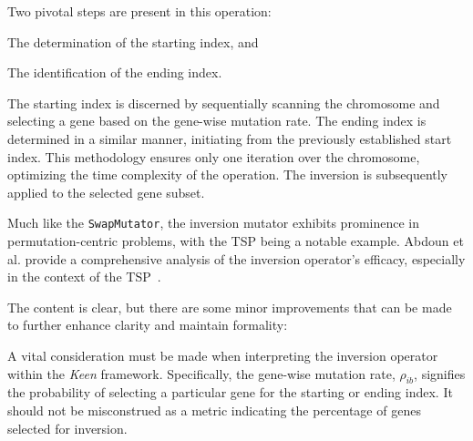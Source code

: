   Two pivotal steps are present in this operation: 
  \begin{enumerate*}
    \item The determination of the starting index, and
    \item The identification of the ending index.
  \end{enumerate*}

  The starting index is discerned by sequentially scanning the chromosome and 
  selecting a gene based on the gene-wise mutation rate. The ending index is 
  determined in a similar manner, initiating from the previously established 
  start index. This methodology ensures only one iteration over the chromosome, 
  optimizing the time complexity of the operation. The inversion is 
  subsequently applied to the selected gene subset.

  Much like the \texttt{SwapMutator}, the inversion mutator exhibits prominence 
  in permutation-centric problems, with the TSP being a notable example. Abdoun 
  et al. provide a comprehensive analysis of the inversion operator's efficacy, 
  especially in the context of the TSP~\autocite{abdounAnalyzingPerformanceMutation2012}.

  The content is clear, but there are some minor improvements that can be made to further enhance clarity and maintain formality:

  \begin{remark}
    A vital consideration must be made when interpreting the inversion operator 
    within the \textit{Keen} framework. Specifically, the gene-wise mutation 
    rate, \(\rho_{ib}\), signifies the probability of selecting a particular gene 
    for the starting or ending index. It should not be misconstrued as a metric 
    indicating the percentage of genes selected for inversion.
  \end{remark}
